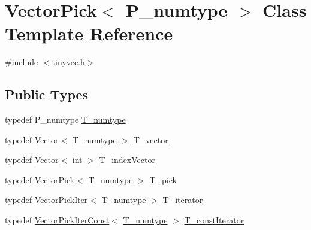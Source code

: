 \hypertarget{classVectorPick}{}\section{Vector\+Pick$<$ P\+\_\+numtype $>$ Class Template Reference}
\label{classVectorPick}


{\ttfamily \#include $<$tinyvec.\+h$>$}

\subsection*{Public Types}
\begin{DoxyCompactItemize}
\item 
typedef P\+\_\+numtype \hyperlink{classVectorPick_a8e830396ccfaea2b85a2a442f45fca35}{T\+\_\+numtype}
\item 
typedef \hyperlink{classVector}{Vector}$<$ \hyperlink{classVectorPick_a8e830396ccfaea2b85a2a442f45fca35}{T\+\_\+numtype} $>$ \hyperlink{classVectorPick_ad84fb47502945888eb8854b1460e493b}{T\+\_\+vector}
\item 
typedef \hyperlink{classVector}{Vector}$<$ int $>$ \hyperlink{classVectorPick_aa9b24fd60f963a737fa946622c5e39a2}{T\+\_\+index\+Vector}
\item 
typedef \hyperlink{classVectorPick}{Vector\+Pick}$<$ \hyperlink{classVectorPick_a8e830396ccfaea2b85a2a442f45fca35}{T\+\_\+numtype} $>$ \hyperlink{classVectorPick_ab257fd713ce0f2a81bc79059cec93ac9}{T\+\_\+pick}
\item 
typedef \hyperlink{classVectorPickIter}{Vector\+Pick\+Iter}$<$ \hyperlink{classVectorPick_a8e830396ccfaea2b85a2a442f45fca35}{T\+\_\+numtype} $>$ \hyperlink{classVectorPick_a8c1792384cedd1074814cc152aea9e72}{T\+\_\+iterator}
\item 
typedef \hyperlink{classVectorPickIterConst}{Vector\+Pick\+Iter\+Const}$<$ \hyperlink{classVectorPick_a8e830396ccfaea2b85a2a442f45fca35}{T\+\_\+numtype} $>$ \hyperlink{classVectorPick_a5c6029ef4573adb719b497be94ce2a57}{T\+\_\+const\+Iterator}
\end{DoxyCompactItemize}
